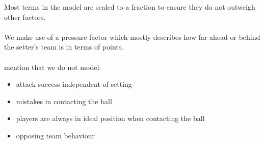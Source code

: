 \documentclass[main.tex]{subfiles}
\begin{document}
      

      Most terms in the model are scaled to a fraction to ensure they do not outweigh other factors.
      \\\\
      We make use of a pressure factor which mostly describes how far ahead or behind the setter's team is in terms of points.
      \\\\
      mention that we do not model:
      \begin{itemize}
        \item attack success independent of setting
        \item mistakes in contacting the ball
        \item players are always in ideal position when contacting the ball
        \item opposing team behaviour
      \end{itemize}
      
\end{document}
